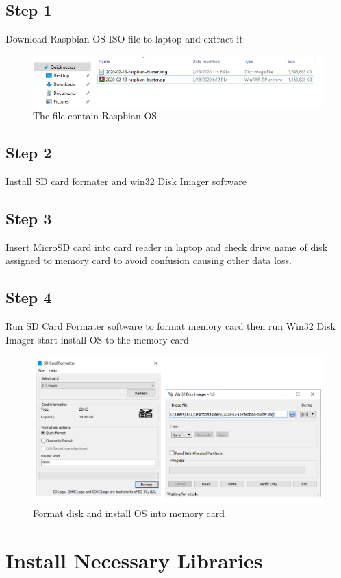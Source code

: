     \subsection{Step 1}
        Download Raspbian OS ISO file to laptop and extract it
        \begin{figure}[H]
            \centering
            \includegraphics[width=0.6\linewidth]{img/download.PNG}
            \caption{The file contain Raspbian OS}
        \end{figure}
    \subsection{Step 2}
        Install SD card formater and win32 Disk Imager software
    \subsection{Step 3}
        Insert MicroSD card into card reader in laptop and check drive name of disk assigned to memory card to avoid 
        confusion causing other data loss. 
    \subsection{Step 4}
        Run SD Card Formater software to format memory card then run Win32 Disk Imager start install OS to the memory card
        \begin{figure}[H]
            \centering
            \includegraphics[width=0.6\linewidth]{img/format-disk.PNG}
            \caption{Format disk and install OS into memory card}
        \end{figure}
\section{Install Necessary Libraries}
